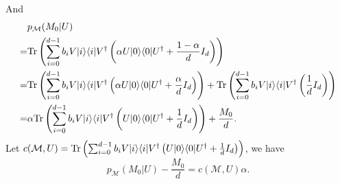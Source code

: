     And
    \begin{equation}
        \begin{aligned}
            & p_{\mathcal{M}}(M_0| U)  \\
            = & \mathrm{Tr}\left(\sum_{i=0}^{d-1} b_i V |i \rangle \langle i | V^\dagger \left( \alpha U | 0 \rangle \langle 0 | U^\dagger + \frac{1-\alpha}{d} I_d\right)\right) \\
            = & \mathrm{Tr}\left(\sum_{i=0}^{d-1} b_i V |i \rangle \langle i | V^\dagger \left( \alpha U | 0 \rangle \langle 0 | U^\dagger + \frac{\alpha}{d} I_d\right)\right) + \mathrm{Tr}\left(\sum_{i=0}^{d-1} b_i V |i \rangle \langle i | V^\dagger \left( \frac{1}{d} I_d\right)\right)\\
            = & \alpha \mathrm{Tr}\left(\sum_{i=0}^{d-1} b_i V |i \rangle \langle i | V^\dagger \left( U | 0 \rangle \langle 0 | U^\dagger + \frac{1}{d} I_d\right)\right) + \frac{M_0}{d}.\\
        \end{aligned}
    \end{equation}
    Let $c(\mathcal{M},U) = \mathrm{Tr}\left(\sum_{i=0}^{d-1} b_i V |i \rangle \langle i | V^\dagger \left( U | 0 \rangle \langle 0 | U^\dagger + \frac{1}{d} I_d\right)\right)$, we have
    \begin{equation}
        p_{\mathcal{M}}(M_0| U) - \frac{M_0}{d} =  c(\mathcal{M},U) \alpha.
    \end{equation}

